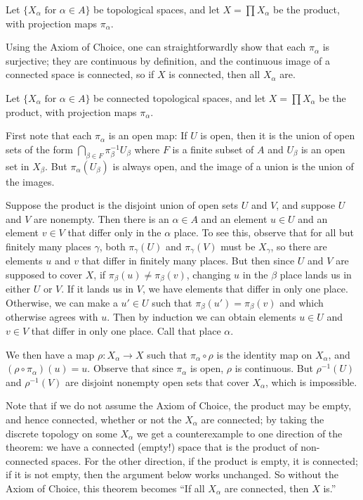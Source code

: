 \documentclass[12pt]{article}
\begin{document}

Let $\{X_\alpha\text{ for }\alpha\in A\}$ be topological spaces, and let $X=\prod X_\alpha$ be the product, with projection maps $\pi_\alpha$.  

Using the Axiom of Choice, one can straightforwardly show that each $\pi_\alpha$ is surjective; they are continuous by definition, and the continuous image of a connected space is connected, so if $X$ is connected, then all $X_\alpha$ are.

Let $\{X_\alpha\text{ for }\alpha\in A\}$ be connected topological spaces, and let $X=\prod X_\alpha$ be the product, with projection maps $\pi_\alpha$. 

First note that each $\pi_\alpha$ is an open map: If $U$ is open, then it is the union of open sets of the form $\bigcap_{\beta\in F} \pi_\beta^{-1} U_\beta$ where $F$ is a finite subset of $A$ and $U_\beta$ is an open set in $X_\beta$. But $\pi_\alpha(U_\beta)$ is always open, and the image of a union is the union of the images.

Suppose the product is the disjoint union of open sets $U$ and $V$, and suppose $U$ and $V$ are nonempty. Then there is an $\alpha\in A$ and an element $u\in U$ and an element $v\in V$ that differ only in the $\alpha$ place.  To see this, observe that for all but finitely many places $\gamma$, both $\pi_\gamma(U)$ and $\pi_\gamma(V)$ must be $X_\gamma$, so there are elements $u$ and $v$ that differ in finitely many places. But then since $U$ and $V$ are supposed to cover $X$, if $\pi_\beta(u)\neq\pi_\beta(v)$, changing $u$ in the $\beta$ place lands us in either $U$ or $V$. If it lands us in $V$, we have elements that differ in only one place. Otherwise, we can make a $u'\in U$ such that $\pi_\beta(u')=\pi_\beta(v)$ and which otherwise agrees with $u$.  Then by induction we can obtain elements $u\in U$ and $v\in V$ that differ in only one place. Call that place $\alpha$.

We then have a map $\rho:X_\alpha\to X$ such that $\pi_\alpha \circ \rho$ is the identity map on $X_\alpha$, and $(\rho\circ\pi_\alpha)(u)=u$. Observe that since $\pi_\alpha$ is open, $\rho$ is continuous.  But $\rho^{-1}(U)$ and $\rho^{-1}(V)$ are disjoint nonempty open sets that cover $X_\alpha$, which is impossible.

Note that if we do not assume the Axiom of Choice, the product may be empty, and hence connected, whether or not the $X_\alpha$ are connected; by taking the discrete topology on some $X_\alpha$ we get a counterexample to one direction of the theorem: we have a connected (empty!) space that is the product of non-connected spaces.
For the other direction, if the product is empty, it is connected; if it is not empty, then the argument below works unchanged.
So without the Axiom of Choice, this theorem becomes ``If all $X_\alpha$ are connected, then $X$ is.''  

\end{document}
